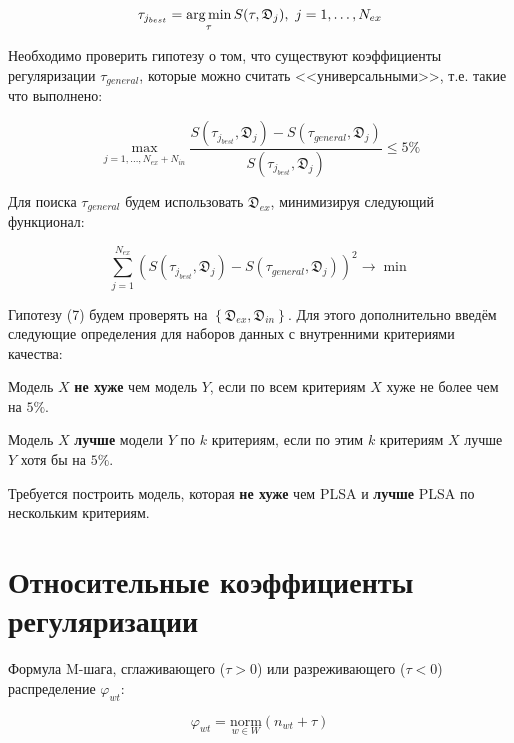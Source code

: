 \documentclass[12pt,twoside]{article}
\begin{document}
	\begin{equation}
	\tau_{j_{best}} = \argmin_{\tau} S(\tau, \mathfrak{D}_j) ,\ j = 1,\dots , N_{ex}
	\end{equation}
	
	Необходимо проверить гипотезу о том, что существуют коэффициенты регуляризации $\tau_{general}$, которые можно считать <<универсальными>>, т.е. такие что выполнено:
	
	\begin{equation}
	\max_{j=1,\dots,N_{ex}+N_{in}} \frac{S(\tau_{j_{best}}, \mathfrak{D}_j)- S(\tau_{general}, \mathfrak{D}_j)}{S(\tau_{j_{best}}, \mathfrak{D}_j)} \leq 5\%
	\end{equation}
	
	Для поиска $\tau_{general}$ будем использовать $\mathfrak{D}_{ex}$, минимизируя следующий функционал:
	
	\begin{equation}
	\sum_{j=1}^{N_{ex}} \left(S(\tau_{j_{best}}, \mathfrak{D}_j)- S(\tau_{general}, \mathfrak{D}_j)\right)^2 \to \min
	\end{equation}
	
	Гипотезу (7) будем проверять на $\left\{\mathfrak{D}_{ex}, \mathfrak{D}_{in}\right\}$. Для этого дополнительно введём следующие определения для наборов данных с внутренними критериями качества:
	
	\begin{Def}
		Модель $X$ {\bf не хуже} чем модель $Y$, если по всем критериям $X$ хуже не более чем на $5\%$.
	\end{Def}
	
	\begin{Def}
		Модель $X$ {\bf лучше} модели $Y$ по $k$ критериям, если по этим $k$ критериям $X$ лучше $Y$ хотя бы на $5\%$.
	\end{Def}
	
	Требуется построить модель, которая {\bf не хуже} чем PLSA\cite{Hofmann:1999:PLS:2073796.2073829} и {\bf лучше} PLSA по нескольким критериям.
	
	\section{Относительные коэффициенты регуляризации}
	
	Формула M-шага, сглаживающего ($\tau > 0$) или разреживающего ($\tau < 0$) распределение
	$\varphi_{wt}$:
	
	\begin{equation}
	\varphi_{wt} = \underset{w \in W}{\text{norm}} \left(n_{wt} + \tau \right)
	\end{equation}
	
\end{document}

